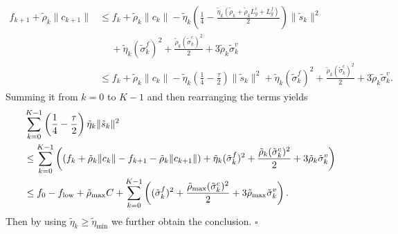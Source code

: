 \documentclass[11pt]{article}
\newenvironment{proof}{{\noindent\it Proof.}\quad}{\hfill $\square$\par}
\newcommand{\be}{\begin{equation}}
\newcommand{\ee}{\end{equation}}
\begin{document}
\begin{proof}
    \begin{align*}
    f_{k+1} + \tilde \rho_k \|c_{k+1}\| &\leq f_k + \tilde \rho_k \|c_k\| - \tilde \eta_k \left(\frac{1}{4}-\frac{\tilde \eta_k (\tilde \rho_k+\tilde \rho_k L_g^c+L_g^f)}{2}\right)  \|\tilde s_k\|^2 \\
    &\quad~+ \tilde \eta_k(\tilde \sigma_k^f)^2 + \frac{\tilde \rho_k(\tilde \sigma_k^c)^2}{2} + 3\tilde \rho_k \tilde \sigma_k^v\\
    &\leq f_k + \tilde \rho_k \|c_k\| - \tilde \eta_k \left(\frac{1}{4}-\frac{\tau}{2}\right)  \|\tilde s_k\|^2 + \tilde \eta_k(\tilde \sigma_k^f)^2 + \frac{\tilde \rho_k(\tilde \sigma_k^c)^2}{2} + 3\tilde \rho_k \tilde \sigma_k^v.
    \end{align*}
    Summing  it from \(k=0\) to \(K-1\) and then rearranging the terms yields
    \be\label{eq:ave-tildes}\begin{aligned}
     &\sum_{k=0}^{K-1} \left(\frac{1}{4}-\frac{\tau}{2}\right)\tilde \eta_k  \|\tilde s_k\|^2 \\
     &\leq   \sum_{k=0}^{K-1} \left(\left(f_k + \tilde \rho_k \|c_k\| - f_{k+1} - \tilde \rho_k\|c_{k+1}\|\right) + \tilde \eta_k(\tilde\sigma_k^f)^2 + \frac{\tilde \rho_k (\tilde \sigma_k^c)^2}{2} + 3\tilde \rho_k \tilde \sigma_k^v\right)\\
    & \le  {f_0-f_{\rm low}+\tilde \rho_{\rm max} C}  +   \sum_{k=0}^{K-1}  \left((\tilde\sigma_k^f)^2 + \frac{ \tilde \rho_{\max}(\tilde \sigma_k^c)^2}{2} + 3\tilde \rho_{\max} \tilde \sigma_k^v\right).
    \end{aligned}\ee
    Then by using $\tilde\eta_k\ge \tilde\eta_{\min}$ we further obtain the conclusion. 
\end{proof}
\end{document}
